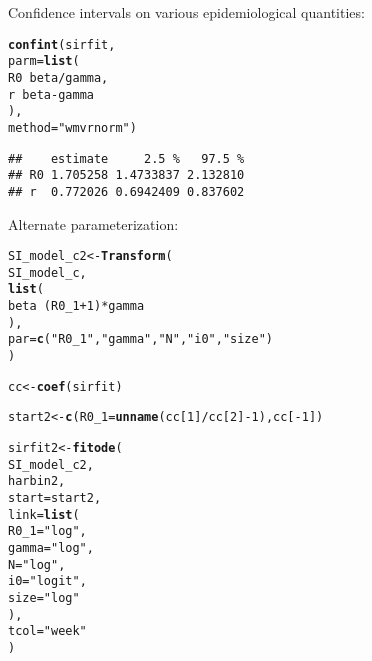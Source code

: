\documentclass{article}\usepackage[]{graphicx}\usepackage[]{color}
\makeatletter
\newcommand{\hlnum}[1]{\textcolor[rgb]{0.686,0.059,0.569}{#1}}%
\newcommand{\hlstr}[1]{\textcolor[rgb]{0.192,0.494,0.8}{#1}}%
\newcommand{\hlopt}[1]{\textcolor[rgb]{0,0,0}{#1}}%
\newcommand{\hlstd}[1]{\textcolor[rgb]{0.345,0.345,0.345}{#1}}%
\newcommand{\hlkwb}[1]{\textcolor[rgb]{0.69,0.353,0.396}{#1}}%
\newcommand{\hlkwc}[1]{\textcolor[rgb]{0.333,0.667,0.333}{#1}}%
\newcommand{\hlkwd}[1]{\textcolor[rgb]{0.737,0.353,0.396}{\textbf{#1}}}%
\newenvironment{kframe}{%
 \def\at@end@of@kframe{}%
 \ifinner\ifhmode%
  \def\at@end@of@kframe{\end{minipage}}%
  \begin{minipage}{\columnwidth}%
 \fi\fi%
 \def\FrameCommand##1{\hskip\@totalleftmargin \hskip-\fboxsep
 \colorbox{shadecolor}{##1}\hskip-\fboxsep
     \hskip-\linewidth \hskip-\@totalleftmargin \hskip\columnwidth}%
 \MakeFramed {\advance\hsize-\width
   \@totalleftmargin\z@ \linewidth\hsize
   \@setminipage}}%
 {\par\unskip\endMakeFramed%
 \at@end@of@kframe}
\newenvironment{knitrout}{}{} %
\makeatother
\begin{document}
Confidence intervals on various epidemiological quantities:

\begin{knitrout}
\color{fgcolor}\begin{kframe}
\begin{alltt}
\hlkwd{confint}\hlstd{(sirfit,}
        \hlkwc{parm}\hlstd{=}\hlkwd{list}\hlstd{(}
            \hlstd{R0}\hlopt{~}\hlstd{beta}\hlopt{/}\hlstd{gamma,}
            \hlstd{r}\hlopt{~}\hlstd{beta}\hlopt{-}\hlstd{gamma}
        \hlstd{),}
        \hlkwc{method}\hlstd{=}\hlstr{"wmvrnorm"}\hlstd{)}
\end{alltt}
\begin{verbatim}
##    estimate     2.5 %   97.5 %
## R0 1.705258 1.4733837 2.132810
## r  0.772026 0.6942409 0.837602
\end{verbatim}
\end{kframe}
\end{knitrout}

Alternate parameterization:

\begin{knitrout}
\color{fgcolor}\begin{kframe}
\begin{alltt}
\hlstd{SI_model_c2} \hlkwb{<-} \hlkwd{Transform}\hlstd{(}
    \hlstd{SI_model_c,}
    \hlkwd{list}\hlstd{(}
        \hlstd{beta}\hlopt{~}\hlstd{(R0_1}\hlopt{+}\hlnum{1}\hlstd{)}\hlopt{*}\hlstd{gamma}
    \hlstd{),}
    \hlkwc{par}\hlstd{=}\hlkwd{c}\hlstd{(}\hlstr{"R0_1"}\hlstd{,} \hlstr{"gamma"}\hlstd{,} \hlstr{"N"}\hlstd{,} \hlstr{"i0"}\hlstd{,} \hlstr{"size"}\hlstd{)}
\hlstd{)}

\hlstd{cc} \hlkwb{<-} \hlkwd{coef}\hlstd{(sirfit)}

\hlstd{start2} \hlkwb{<-} \hlkwd{c}\hlstd{(}\hlkwc{R0_1}\hlstd{=}\hlkwd{unname}\hlstd{(cc[}\hlnum{1}\hlstd{]}\hlopt{/}\hlstd{cc[}\hlnum{2}\hlstd{]}\hlopt{-}\hlnum{1}\hlstd{), cc[}\hlopt{-}\hlnum{1}\hlstd{])}

\hlstd{sirfit2} \hlkwb{<-} \hlkwd{fitode}\hlstd{(}
    \hlstd{SI_model_c2,}
    \hlstd{harbin2,}
    \hlkwc{start}\hlstd{=start2,}
    \hlkwc{link} \hlstd{=} \hlkwd{list}\hlstd{(}
        \hlkwc{R0_1}\hlstd{=}\hlstr{"log"}\hlstd{,}
        \hlkwc{gamma}\hlstd{=}\hlstr{"log"}\hlstd{,}
        \hlkwc{N}\hlstd{=}\hlstr{"log"}\hlstd{,}
        \hlkwc{i0}\hlstd{=}\hlstr{"logit"}\hlstd{,}
        \hlkwc{size}\hlstd{=}\hlstr{"log"}
    \hlstd{),}
    \hlkwc{tcol}\hlstd{=}\hlstr{"week"}
\hlstd{)}
\end{alltt}


{\ttfamily\noindent\itshape\color{messagecolor}{\#\# Fitting ode ...}}

{\ttfamily\noindent\itshape\color{messagecolor}{\#\# Computing vcov on the original scale ...}}\end{kframe}
\end{knitrout}
\end{document}
